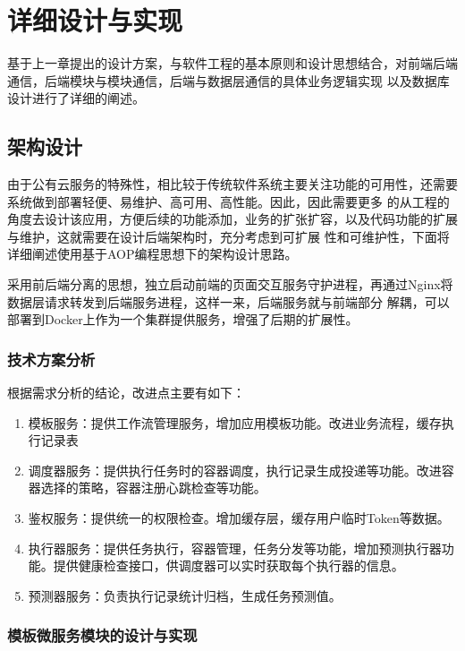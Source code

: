
\chapter{详细设计与实现}
基于上一章提出的设计方案，与软件工程的基本原则和设计思想结合，对前端后端通信，后端模块与模块通信，后端与数据层通信的具体业务逻辑实现
以及数据库设计进行了详细的阐述。


\section{架构设计}
由于公有云服务的特殊性，相比较于传统软件系统主要关注功能的可用性，还需要系统做到部署轻便、易维护、高可用、高性能。因此，因此需要更多
的从工程的角度去设计该应用，方便后续的功能添加，业务的扩张扩容，以及代码功能的扩展与维护，这就需要在设计后端架构时，充分考虑到可扩展
性和可维护性，下面将详细阐述使用基于AOP编程思想下的架构设计思路。

采用前后端分离的思想，独立启动前端的页面交互服务守护进程，再通过Nginx将数据层请求转发到后端服务进程，这样一来，后端服务就与前端部分
解耦，可以部署到Docker上作为一个集群提供服务，增强了后期的扩展性。



\subsection{技术方案分析}

根据需求分析的结论，改进点主要有如下：
\begin{enumerate}
    \item 模板服务：提供工作流管理服务，增加应用模板功能。改进业务流程，缓存执行记录表
    \item 调度器服务：提供执行任务时的容器调度，执行记录生成投递等功能。改进容器选择的策略，容器注册心跳检查等功能。
    \item 鉴权服务：提供统一的权限检查。增加缓存层，缓存用户临时Token等数据。
    \item 执行器服务：提供任务执行，容器管理，任务分发等功能，增加预测执行器功能。提供健康检查接口，供调度器可以实时获取每个执行器的信息。
    \item 预测器服务：负责执行记录统计归档，生成任务预测值。
\end{enumerate}


\subsection{模板微服务模块的设计与实现}



